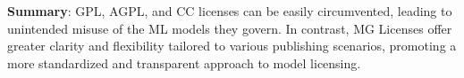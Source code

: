 \begin{tcolorbox}[boxrule=0.2mm, boxsep=1mm, left=0mm, right=0mm, top=0.1mm, bottom=0.1mm]
    \textbf{Summary}: GPL, AGPL, and CC licenses can be easily circumvented, leading to unintended misuse of the ML models they govern. In contrast, MG Licenses offer greater clarity and flexibility tailored to various publishing scenarios, promoting a more standardized and transparent approach to model licensing.
\end{tcolorbox}